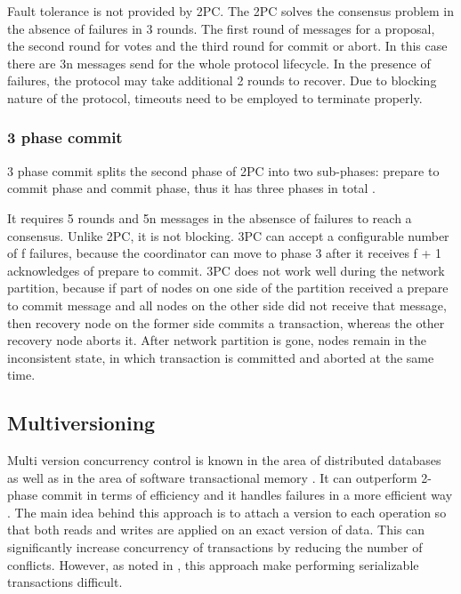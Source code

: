 \documentclass[runningheads,a4paper]{llncs}
\begin{document}
Fault tolerance is not provided by 2PC. The 2PC solves the consensus problem in the absence of failures in 3 rounds. The first  round of messages for a proposal, the second round for votes and the third round for commit or abort. In this case there are 3n messages send for the whole protocol lifecycle. In the presence of failures,  the protocol may take additional 2 rounds to recover. Due to blocking nature of the protocol, timeouts need to be employed to terminate properly.

\subsubsection{3 phase commit}

3 phase commit splits the second phase of 2PC into two sub-phases: prepare to commit phase and commit phase, thus it has three phases in total \cite{Bernstein:1987}.

It requires 5 rounds and 5n messages in the absensce of failures to reach a consensus.  Unlike 2PC, it is not blocking. 3PC can accept a configurable number of f failures, because the coordinator can move to phase 3 after it receives f + 1 acknowledges of prepare to commit. 3PC does not work well during the network partition, because if part of nodes on one side of the partition received a prepare to commit message and all nodes on the other side did not receive that message, then recovery node on the former side commits a transaction, whereas the other recovery node aborts it. After network partition is gone, nodes remain in the inconsistent state, in which transaction is committed and aborted at the same time.

\subsection{Multiversioning} 

Multi version concurrency control \cite{Bernstein:1983} is known in the area of distributed databases as well as in the area of software transactional memory \cite{Perelman:2010}. It can outperform 2-phase commit in terms of efficiency and it handles failures in a more efficient way \cite{Halici:1991}. The main idea behind this approach is to attach a version to each operation so that both reads and writes are applied on an exact version of data. This can significantly increase concurrency of transactions by reducing the number of conflicts. However, as noted in \cite{Faleiro:2015}, this approach make performing serializable transactions difficult.
\end{document}
